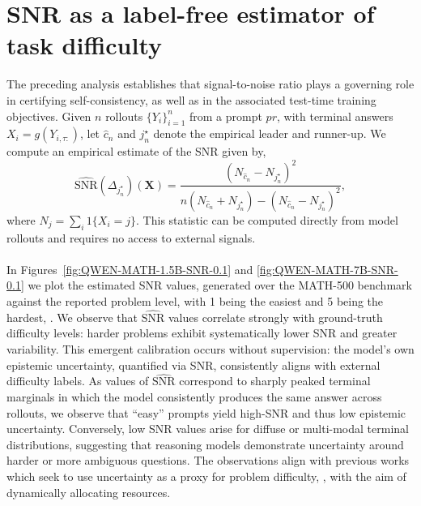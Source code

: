 \section{SNR as a label-free estimator of task difficulty} 
\label{sec:snr-difficulty}

The preceding analysis establishes that signal-to-noise ratio  plays a governing role in certifying self-consistency, as well as in the associated  test-time
training objectives.  Given $n$ rollouts $\{Y_{i}\}_{i=1}^n$ from a prompt ${pr}$,
with terminal answers $X_i = g(Y_{i,\tau:})$, let
$\widehat c_n$ and $j^\star_n$ denote the empirical leader and runner-up.
We compute an empirical estimate of the SNR given by,
\begin{equation}\label{eq:snr_for_difficulty_estimation}
\widehat{\mathrm{SNR}}(\Delta_{j^\star_n})(\mathbf{X})
= \frac{(N_{\hat c_n} - N_{j^\star_n})^2}{
n(N_{\hat c_n} + N_{j^\star_n})
 - (N_{\hat c_n} - N_{j^\star_n})^2},
\end{equation}
where $N_j = \sum_i 1\{X_i = j\}$.
This statistic can be computed directly from model rollouts and requires no
access to external signals.
\\\\
In 
Figures~\ref{fig:QWEN-MATH-1.5B-SNR-0.1} and \ref{fig:QWEN-MATH-7B-SNR-0.1} we plot the estimated SNR values, generated over the MATH-500 benchmark against the reported problem level, with 1 being the easiest and 5 being the hardest,  \cite{lightman2023let}.   We observe that $\widehat{\mathrm{SNR}}$ values correlate strongly with
ground-truth difficulty levels:  harder problems exhibit systematically lower
SNR and greater variability.
This emergent calibration occurs without supervision: the model's own
epistemic uncertainty, quantified via SNR, consistently aligns with external difficulty
labels.   As values of $\widehat{\mathrm{SNR}}$ correspond to sharply peaked terminal
marginals in which the model consistently produces the same answer across
rollouts, we observe that ``easy'' prompts yield  high-SNR and thus low epistemic uncertainty.   Conversely, low SNR values arise for diffuse or multi-modal terminal
distributions, suggesting that reasoning models demonstrate uncertainty around harder or more ambiguous questions.   The observations align with previous works which seek to use uncertainty as a proxy for problem difficulty, \cite{wang2025make, wan2025reasoning,fu2025deep}, with the aim of dynamically allocating resources.
